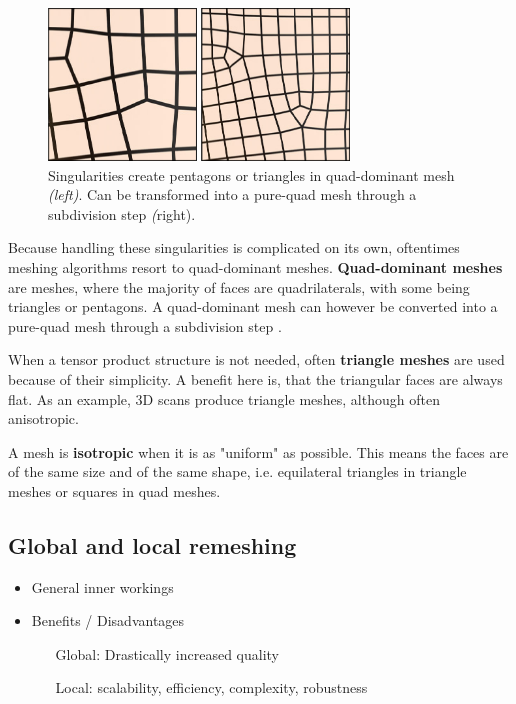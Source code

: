 \documentclass{ACGSeminar}
\begin{document}
\begin{figure}[htb!]
	\begin{centering}
		\includegraphics[width=8cm]{img/Singularities.png}\par
	\end{centering}
	\caption{Singularities create pentagons or triangles in quad-dominant mesh \textit{(left)}. Can be transformed into a pure-quad mesh through a subdivision step \textit(right). \cite{jakob2015instant}}
	\label{fig:singularities}
\end{figure}

Because handling these singularities is complicated on its own, oftentimes meshing algorithms resort to quad-dominant meshes. \textbf{Quad-dominant meshes} are meshes, where the majority of faces are quadrilaterals, with some being triangles or pentagons. A quad-dominant mesh can however be converted into a pure-quad mesh through a subdivision step \cite{jakob2015instant}.\bigskip

When a tensor product structure is not needed, often \textbf{triangle meshes} are used because of their simplicity. A benefit here is, that the triangular faces are always flat. As an example, 3D scans produce triangle meshes, although often anisotropic.\bigskip

A mesh is \textbf{isotropic} when it is as "uniform" as possible. This means the faces are of the same size and of the same shape, i.e. equilateral triangles in triangle meshes or squares in quad meshes.


\subsection{Global and local remeshing}
\cite{jakob2015instant,alliez2008recent}
\begin{itemize}
	\item	General inner workings
	\item	Benefits / Disadvantages
		\begin{itemize}
			\item[Global:]	Drastically increased quality
			\item[Local:]	scalability, efficiency, complexity, robustness
		\end{itemize}
\end{itemize}
\end{document}
